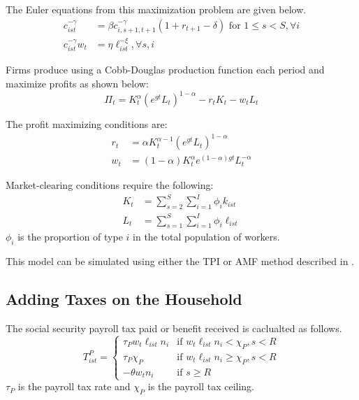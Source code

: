 \documentclass[letterpaper,12pt]{article}
\theoremstyle{definition}
\numberwithin{equation}{section}
\begin{document}
\begin{spacing}{1.5}
    The Euler equations from this maximization problem are given below.
    \begin{align}
    c_{ist}^{-\gamma} & = \beta c_{i,s+1,t+1}^{-\gamma}(1+r_{t+1}-\delta) \text{     for } 1\le s<S,\forall i \label{Macro_Base_Euler1}\\
    c_{ist}^{-\gamma} w_t & = \eta \ell_{ist}^{-\xi}, \forall s,i \label{Macro_Base_Euler2}
    \end{align}

    Firms produce using a Cobb-Douglas production function each period and maximize profits as shown below:
    \begin{equation}
    \Pi_t = K_t^\alpha (e^{gt}L_t)^{1-\alpha} - r_tK_t - w_tL_t \label{Macro_Base_Profit}
    \end{equation}

    The profit maximizing conditions are:
    \begin{align}
    r_t & = \alpha K_t^{\alpha-1}(e^{gt}L_t)^{1-\alpha} \label{Macro_Base_FirmFOC1}\\
    w_t & = (1-\alpha) K_t^{\alpha}e^{(1-\alpha)gt}L_t^{-\alpha} \label{Macro_Base_FirmFOC2}
    \end{align}

    Market-clearing conditions require the following:
    \begin{align}
    K_t & = \sum_{s=2}^S \sum_{i=1}^I \phi_i k_{ist} \label{Macro_Base_Clear1}\\
    L_t & = \sum_{s=1}^S \sum_{i=1}^I \phi_i \ell_{ist} \label{Macro_Base_Clear2}
    \end{align}
    $\phi_i$ is the proportion of type $i$ in the total population of workers.

    This model can be simulated using either the TPI or AMF method described in \citet{EvansPhillips2014}.

  \subsection{Adding Taxes on the Household}\label{SubSec_Macro_HHTax}
    The social security payroll tax paid or benefit received is caclualted as follows.
    \begin{equation}\label{Macro_HHTax_PayrollTax}
    T^P_{ist} = \left\{ \begin{matrix} \tau_P w_t \ell_{ist} n_i & \text{if } w_t \ell_{ist} n_i < \chi_P, s<R \\
                                       \tau_P \chi_P & \text{if } w_t \ell_{ist} n_i \ge \chi_P, s<R \\
                                       -\theta w_t n_i & \text{if } s\ge R
                                       \end{matrix} \right.
    \end{equation}
    $\tau_P$ is the payroll tax rate and $\chi_P$ is the payroll tax ceiling.


\end{spacing}
\end{document}
